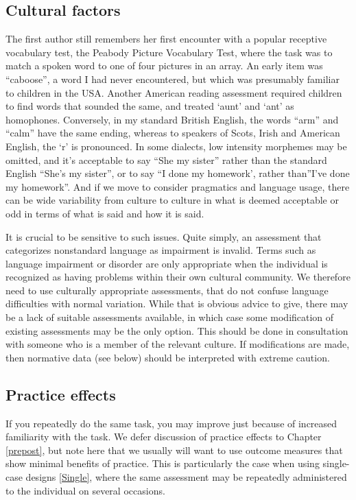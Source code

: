\documentclass{krantz}
\begin{document}
\hypertarget{cultural-factors}{%
\subsection{Cultural factors}\label{cultural-factors}}

The first author still remembers her first encounter with a popular receptive vocabulary test, the Peabody Picture Vocabulary Test, where the task was to match a spoken word to one of four pictures in an array. An early item was ``caboose'', a word I had never encountered, but which was presumably familiar to children in the USA. Another American reading assessment required children to find words that sounded the same, and treated `aunt' and `ant' as homophones. Conversely, in my standard British English, the words ``arm'' and ``calm'' have the same ending, whereas to speakers of Scots, Irish and American English, the `r' is pronounced. In some dialects, low intensity morphemes may be omitted, and it's acceptable to say ``She my sister'' rather than the standard English ``She's my sister'', or to say ``I done my homework', rather than''I've done my homework''. And if we move to consider pragmatics and language usage, there can be wide variability from culture to culture in what is deemed acceptable or odd in terms of what is said and how it is said.

It is crucial to be sensitive to such issues. Quite simply, an assessment that categorizes nonstandard language as impairment is invalid. Terms such as language impairment or disorder are only appropriate when the individual is recognized as having problems within their own cultural community. We therefore need to use culturally appropriate assessments, that do not confuse language difficulties with normal variation. While that is obvious advice to give, there may be a lack of suitable assessments available, in which case some modification of existing assessments may be the only option. This should be done in consultation with someone who is a member of the relevant culture. If modifications are made, then normative data (see below) should be interpreted with extreme caution.

\hypertarget{practice-effects}{%
\subsection{Practice effects}\label{practice-effects}}

If you repeatedly do the same task, you may improve just because of increased familiarity with the task. We defer discussion of practice effects to Chapter \ref{prepost}, but note here that we usually will want to use outcome measures that show minimal benefits of practice. This is particularly the case when using single-case designs \ref{Single}, where the same assessment may be repeatedly administered to the individual on several occasions.
\end{document}
